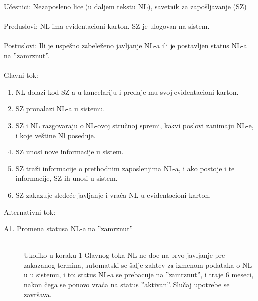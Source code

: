 \noindent U\v cesnici: Nezaposleno lice (u daljem tekstu NL), savetnik za zapo\v sljavanje (SZ)
\\
\\ Preduslovi: NL ima evidentacioni karton. SZ je ulogovan na sistem. 
\\
\\ Postuslovi: Ili je uspe\v sno zabele\v zeno javljanje NL-a ili je postavljen status NL-a na ''zamrznut''.
\\ 
\\ Glavni tok:
\begin{enumerate}
	\item NL dolazi kod SZ-a u kancelariju i predaje mu svoj evidentacioni karton.
	\item SZ pronalazi NL-a u sistemu.
	\item SZ i NL razgovaraju o NL-ovoj stru\v cnoj spremi, kakvi poslovi zanimaju NL-e, i koje ve\v stine Nl poseduje.
	\item SZ unosi nove informacije u sistem.
	\item SZ tra\v zi informacije o prethodnim zaposlenjima NL-a, i ako postoje i te informacije, SZ ih unosi u sistem.
	\item SZ zakazuje slede\' ce javljanje i vra\' ca NL-u evidentacioni karton.
\end{enumerate}

\noindent Alternativni tok:
\begin{description}
	\item[A1. Promena statusa NL-a na ''zamrznut''] ~\\
	Ukoliko u koraku 1 Glavnog toka NL ne do\dj e na prvo javljanje pre zakazanog termina, automatski se \v salje zahtev za izmenom podataka o NL-u u sistemu, i to: status NL-a se prebacuje na ''zamrznut'', i traje 6 meseci, nakon \v cega se ponovo vra\' ca na status ''aktivan''. Slu\v caj upotrebe se zavr\v sava.
\end{description}